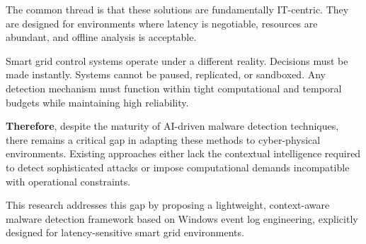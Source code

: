 \documentclass[conference]{IEEEtran}
\begin{document}
The common thread is that these solutions are fundamentally IT-centric. They are designed for environments where latency is negotiable, resources are abundant, and offline analysis is acceptable.

Smart grid control systems operate under a different reality. Decisions must be made instantly. Systems cannot be paused, replicated, or sandboxed. Any detection mechanism must function within tight computational and temporal budgets while maintaining high reliability.

\textbf{Therefore}, despite the maturity of AI-driven malware detection techniques, there remains a critical gap in adapting these methods to cyber-physical environments. Existing approaches either lack the contextual intelligence required to detect sophisticated attacks or impose computational demands incompatible with operational constraints.

This research addresses this gap by proposing a lightweight, context-aware malware detection framework based on Windows event log engineering, explicitly designed for latency-sensitive smart grid environments.



\end{document}
